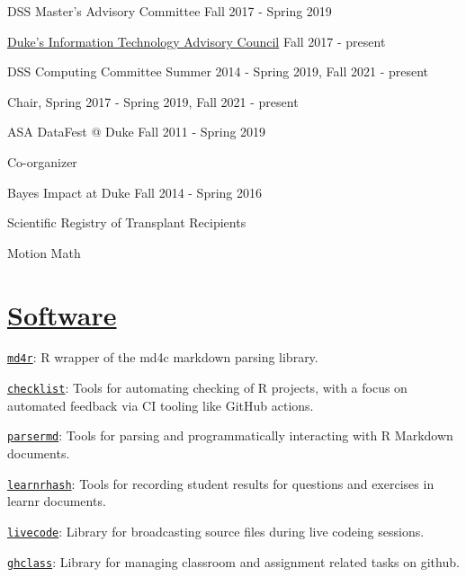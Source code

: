 \documentclass[margin,line]{res}
\begin{document}
\begin{resume}
DSS Master's Advisory Committee \hfill Fall 2017 - Spring 2019

\href{http://services.duke.edu/itac/}{Duke's Information Technology Advisory Council} \hfill Fall 2017 - present

DSS Computing Committee \hfill Summer 2014 - Spring 2019, Fall 2021 - present
\begin{list1}
\item[] Chair, Spring 2017 - Spring 2019, Fall 2021 - present              
\end{list1}

ASA DataFest @ Duke \hfill Fall 2011 - Spring 2019
\begin{list1}
\item[] Co-organizer
\end{list1}


Bayes Impact at Duke \hfill Fall 2014 - Spring 2016
\begin{list1}
\item[] Scientific Registry of Transplant Recipients
\item[] Motion Math
\end{list1}


\vspace{4mm}

\section{\sc \href{https://github.com/rundel/}{Software}}

\href{https://github.com/rundel/md4r}{\texttt{md4r}}: R wrapper of the md4c markdown parsing library.

\href{https://github.com/rundel/checklist}{\texttt{checklist}}: Tools for automating checking of R projects, with a focus on automated feedback via CI tooling like GitHub actions.

\href{https://github.com/rundel/parsermd}{\texttt{parsermd}}: Tools for parsing and programmatically interacting with R Markdown documents.

\href{https://github.com/rundel/learnrhash}{\texttt{learnrhash}}: Tools for recording student results for questions and exercises in learnr documents.

\href{https://github.com/rundel/livecode}{\texttt{livecode}}: Library for broadcasting source files during live codeing sessions.

\href{https://github.com/rundel/ghclass}{\texttt{ghclass}}: Library for managing classroom and assignment related tasks on github.


\end{resume}
\end{document}
